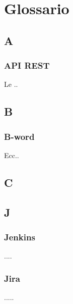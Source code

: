 
\chapter{Glossario}

\section*{A}
    \subsection*{API REST}
    Le ..

\section*{B}
    \subsection*{B-word}
    Ecc..

\section*{C}    


\section*{J}
    \subsection*{Jenkins}
    ....

    \subsection*{Jira}
    .....
